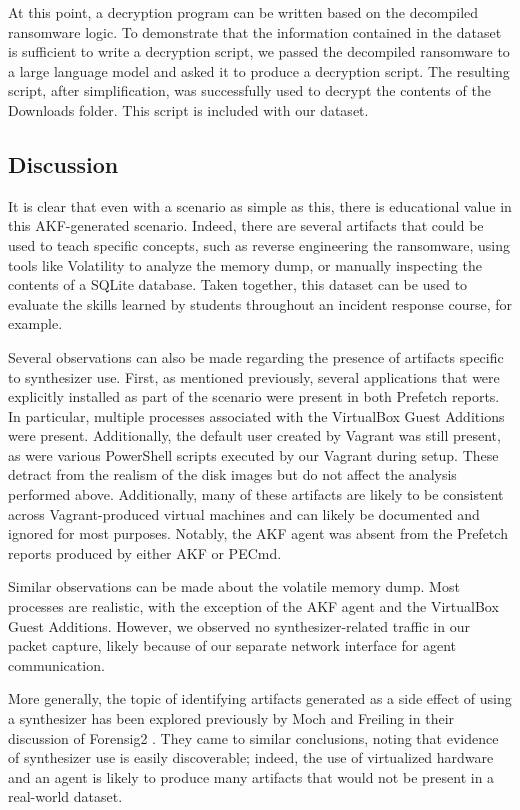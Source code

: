 \documentclass[final,5p,times,twocolumn]{elsarticle}
\begin{document}
At this point, a decryption program can be written based on the
decompiled ransomware logic. To demonstrate that the information
contained in the dataset is sufficient to write a decryption script, we
passed the decompiled ransomware to a large language model and asked it
to produce a decryption script. The resulting script, after
simplification, was successfully used to decrypt the contents of the
Downloads folder. This script is included with our dataset.

\subsection{Discussion}\label{discussion}

It is clear that even with a scenario as simple as this, there is
educational value in this AKF-generated scenario. Indeed, there are
several artifacts that could be used to teach specific concepts, such as
reverse engineering the ransomware, using tools like Volatility to
analyze the memory dump, or manually inspecting the contents of a SQLite
database. Taken together, this dataset can be used to evaluate the
skills learned by students throughout an incident response course, for
example.

Several observations can also be made regarding the presence of
artifacts specific to synthesizer use. First, as mentioned previously,
several applications that were explicitly installed as part of the
scenario were present in both Prefetch reports. In particular, multiple
processes associated with the VirtualBox Guest Additions were present.
Additionally, the default user created by Vagrant was still present, as
were various PowerShell scripts executed by our Vagrant during setup.
These detract from the realism of the disk images but do not affect the
analysis performed above. Additionally, many of these artifacts are
likely to be consistent across Vagrant-produced virtual machines and can
likely be documented and ignored for most purposes. Notably, the AKF
agent was absent from the Prefetch reports produced by either AKF or
PECmd.

Similar observations can be made about the volatile memory dump. Most
processes are realistic, with the exception of the AKF agent and the
VirtualBox Guest Additions. However, we observed no synthesizer-related
traffic in our packet capture, likely because of our separate network
interface for agent communication.

More generally, the topic of identifying artifacts generated as a side
effect of using a synthesizer has been explored previously by Moch and
Freiling in their discussion of Forensig2
\citep{mochForensicImageGenerator2009,mochEvaluatingForensicImage2012}.
They came to similar conclusions, noting that evidence of synthesizer
use is easily discoverable; indeed, the use of virtualized hardware and
an agent is likely to produce many artifacts that would not be present
in a real-world dataset.
\end{document}
